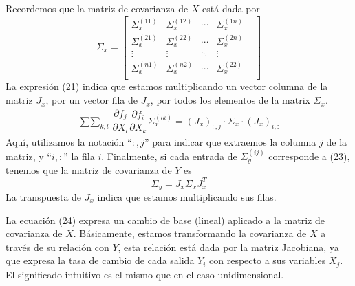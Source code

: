 \documentclass[a4paper, 10pt]{article}
\begin{document}
Recordemos que la matriz de covarianza de $X$ está dada por
\begin{equation}
    \Sigma_x = \begin{bmatrix}
        \Sigma_x^{(11)} & \Sigma_x^{(12)} & \cdots & \Sigma_x^{(1n)}\\
        \Sigma_x^{(21)} & \Sigma_x^{(22)} & \cdots & \Sigma_x^{(2n)} \\
        \vdots & \vdots & \ddots &\vdots \\
        \Sigma_x^{(n1)} & \Sigma_x^{(n2)} & \cdots & \Sigma_x^{(22)} & \\
    \end{bmatrix}
\end{equation}
La expresión (21) indica que estamos multiplicando un vector columna de la matriz $J_x$, por 
un vector fila de $J_x$, por todos los elementos de la matrix $\Sigma_x$.
\begin{equation}
    \begin{split}
        \mathop{\sum\sum}_{k,l}{\dfrac{\partial f_j}{\partial X_l} \dfrac{\partial f_i}{\partial X_k}\Sigma_x^{(lk)}} = (J_{x})_{:,j} \cdot \Sigma_x \cdot (J_{x})_{i,:}
    \end{split}
\end{equation}
Aquí, utilizamos la notación ``$:,j$'' para indicar que extraemos la columna $j$ de la matriz, y ``$i,:$'' la fila $i$. Finalmente, si cada entrada de $\Sigma_y^{(ij)}$ corresponde 
a (23), tenemos que la matriz de covarianza de $Y$ es 
\begin{equation}
    \Sigma_y = J_x \Sigma_x J_x^{T}
\end{equation}
La transpuesta de $J_x$ indica que estamos multiplicando sus filas.

La ecuación (24) expresa un cambio de base (lineal) aplicado a la matriz de covarianza de $X$. Básicamente, estamos transformando la covarianza de $X$ a 
través de su relación con $Y$, esta relación está dada por la matriz Jacobiana, ya que expresa la tasa de cambio de cada salida $Y_i$ con respecto a sus 
variables $X_j$. El significado intuitivo es el mismo que en el caso unidimensional.
\end{document}
